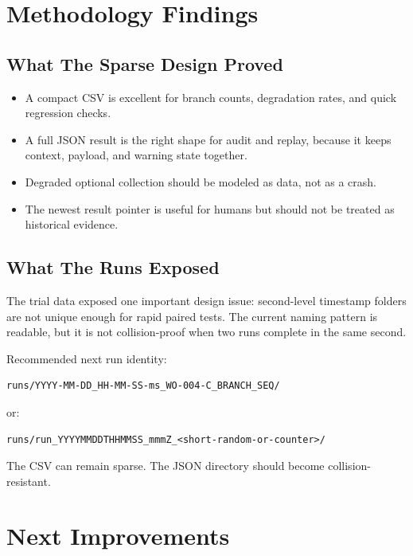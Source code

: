 \documentclass[11pt,a4paper]{article}
\begin{document}
\section{Methodology Findings}

\subsection{What The Sparse Design Proved}

\begin{itemize}
\item A compact CSV is excellent for branch counts, degradation rates, and
quick regression checks.
\item A full JSON result is the right shape for audit and replay, because it
keeps context, payload, and warning state together.
\item Degraded optional collection should be modeled as data, not as a crash.
\item The newest result pointer is useful for humans but should not be treated
as historical evidence.
\end{itemize}

\subsection{What The Runs Exposed}

The trial data exposed one important design issue: second-level timestamp
folders are not unique enough for rapid paired tests. The current naming
pattern is readable, but it is not collision-proof when two runs complete in
the same second.

Recommended next run identity:

\begin{lstlisting}[language={}]
runs/YYYY-MM-DD_HH-MM-SS-ms_WO-004-C_BRANCH_SEQ/
\end{lstlisting}

or:

\begin{lstlisting}[language={}]
runs/run_YYYYMMDDTHHMMSS_mmmZ_<short-random-or-counter>/
\end{lstlisting}

The CSV can remain sparse. The JSON directory should become collision-resistant.

\section{Next Improvements}
\end{document}
